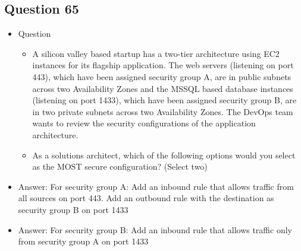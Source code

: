 \documentclass[]{scrartcl}
\begin{document}
\subsection{Question 65}
\begin{itemize}
	\item Question
	\begin{itemize}
		\item A silicon valley based startup has a two-tier architecture using EC2 instances for its flagship application. The web servers (listening on port 443), which have been assigned security group A, are in public subnets across two Availability Zones and the MSSQL based database instances (listening on port 1433), which have been assigned security group B, are in two private subnets across two Availability Zones. The DevOps team wants to review the security configurations of the application architecture.
		\item As a solutions architect, which of the following options would you select as the MOST secure configuration? (Select two)
	\end{itemize}
	\item Answer: For security group A: Add an inbound rule that allows traffic from all sources on port 443. Add an outbound rule with the destination as security group B on port 1433
	\item Answer: For security group B: Add an inbound rule that allows traffic only from security group A on port 1433
\end{itemize}
\end{document}

